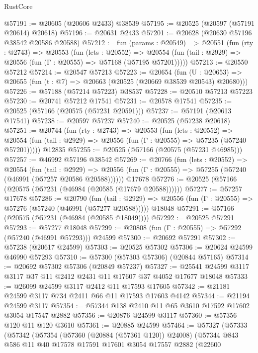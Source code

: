 \begin{lexlean}{RustCore}
\begin{coremodule}
@57191 := @20605 (@20606 @2433) @38539
@57195 := @20525 (@20597 (@57191 @20614) @20618)
@57196 := @20631 @2433
@57201 := @20628 (@20630 @57196 @38542 @20586 @20588)
@57212 := fun (params : @20549) =>
  @20551
    (fun (rty : @2743) =>
    @20553
      (fun (lets : @20552) =>
      @20554 (fun (tail : @2929) => @20556 (fun (Γ : @20555) => @57168 (@57195 @57201)))))
@57213 := @20550 @57212
@57214 := @20547 @57213
@57223 := @20654
    (fun (U : @20653) => @20655 (fun (t : @7) => @20663 (@20525 (@20669 @38539 @20543) @20680)))
@57226 := @57188 (@57214 @57223) @38537
@57228 := @20510 @57213 @57223
@57230 := @20741 @57212 @17541
@57231 := @20578 @17541
@57235 := @20525 (@57166 (@20575 (@57231 @20591)))
@57237 := @57191 (@20613 @17541)
@57238 := @20597 @57237
@57240 := @20525 (@57238 @20618)
@57251 := @20744
    (fun (rty : @2743) =>
    @20553
      (fun (lets : @20552) =>
      @20554 (fun (tail : @2929) => @20556 (fun (Γ : @20555) => @57235 (@57240 @57201)))))
    @12835
@57255 := @20525 (@57166 (@20575 (@57231 @46985)))
@57257 := @46992 @57196 @38542
@57269 := @20766
    (fun (lets : @20552) =>
    @20554
      (fun (tail : @2929) =>
      @20556 (fun (Γ : @20555) => @57255 (@57240 (@46991 (@57257 @20586 @20588))))))
    @17678
@57276 := @20525 (@57166 (@20575 (@57231 (@46984 (@20585 (@17679 @20588))))))
@57277 := @57257 @17678
@57286 := @20790
    (fun (tail : @2929) => @20556 (fun (Γ : @20555) => @57276 (@57240 (@46991 (@57277 @20588)))))
    @18048
@57291 := @57166 (@20575 (@57231 (@46984 (@20585 @18049))))
@57292 := @20525 @57291
@57293 := @57277 @18048
@57299 := @20808 (fun (Γ : @20555) => @57292 (@57240 (@46991 @57293))) @24599
@57300 := @20692 @57291
@57302 := @57238 (@20617 @24599)
@57303 := @20525 @57302
@57306 := @20624 @24599 @46990 @57293
@57310 := @57300 (@57303 @57306) (@20844 @57165)
@57314 := @20692 @57302 @57306 (@20849 @57237)
@57327 := @25541 @24599 @3117 @3117 @37 @11 @2412 @2431 @11 @17607 @37 @4052 @17677 @18048
@57333 := @26099 @24599 @3117 @2412 @11 @17593 @17605
@57342 := @21181 @24599 @3117 @734 @2411 @66 @11 @17593 @17603 @4142
@57344 := @21194 @24599 @3117
@57354 := @57344 @138 @2410 @11 @65 @3610 @17592 @17602 @3054 @17547 @2882
@57356 := @20876 @24599 @3117
@57360 := @57356 @120 @11 @120 @3610
@57361 := @20885 @24599
@57464 := @57327
    (@57333
      (@57342
        (@57354
          (@57360 (@20884 (@57361 @120)) @24008)
          (@57344
            @843
            @586
            @11
            @40
            @17578
            @17591
            @17601
            @3054
            @17557
            @2882
            (@22600

\end{coremodule}
\end{lexlean}
